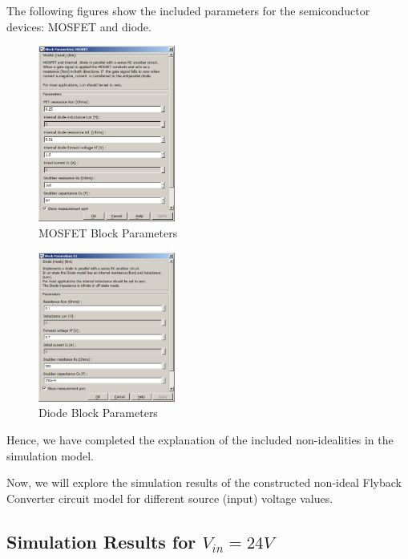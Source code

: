 The following figures show the included parameters for the semiconductor devices: MOSFET and diode.

\begin{figure}[H]
\begin{center}
\includegraphics[width=0.4\textwidth]{simulations/mosfet_para.png}
\caption{MOSFET Block Parameters}
\label{fig:mosfet_para}
\end{center}
\end{figure}

\begin{figure}[H]
\begin{center}
\includegraphics[width=0.4\textwidth]{simulations/diode_para.png}
\caption{Diode Block Parameters}
\label{fig:diode_para}
\end{center}
\end{figure}

Hence, we have completed the explanation of the included non-idealities in the simulation model. 

Now, we will explore the simulation results of the constructed non-ideal Flyback Converter circuit model for different source (input) voltage values.

\subsection{Simulation Results for $V_{in} = 24V$}

